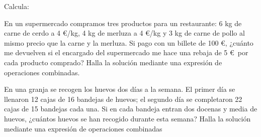 \documentclass[spanish, 11pt]{exam}
\begin{document}
\begin{questions}

\question[2] Calcula:

\question[2] En un supermercado compramos tres productos para
  un restaurante: 6 kg de carne de cerdo a 4 \euro/kg, 4 kg de merluza a 4
  \euro/kg y 3 kg de carne de pollo al mismo precio que la carne y la
  merluza. Si pago con un billete de 100 \euro, ¿cuánto me devuelven si el
  encargado del supermercado me hace una rebaja de 5 \euro \ por cada producto
  comprado? Halla la solución mediante una expresión de operaciones
  combinadas. 

\question[2] En una granja se recogen los huevos dos días a la
  semana. El primer día se llenaron 12 cajas de 16 bandejas de huevos;
  el segundo día se completaron 22 cajas de 15 bandejas cada una. Si en
  cada bandeja entran dos docenas y media de huevos, ¿cuántos huevos se
  han recogido durante esta semana? Halla la solución mediante una
  expresión de operaciones combinadas


% 


\end{questions}
\end{document}
